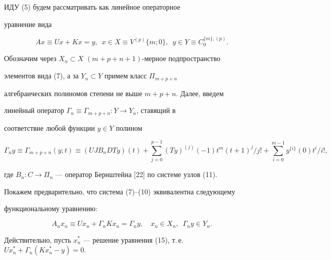 \begin{pf} 


ИДУ (5) будем рассматривать как линейное операторное 


уравнение вида 


\begin{equation} 


Ax\equiv U x+K x=y,\ \; x\in X\equiv V^{(p)}\{m;0\},\ \; 


y\in Y\equiv C^{\{m\},(p)}_0. 


\end{equation} 


 


Обозначим через $X_n\subset X$\; $(m+p+n+1)$-мерное подпространство 


элементов вида (7), а за $Y_n\subset Y$ примем класс $\Pi_{m+p+n}$ 


алгебраических полиномов степени не выше $m+p+n$. Далее, введем 


линейный оператор $\Gamma_n\equiv\Gamma_{m+p+n}:Y\to Y_n$, ставящий в 


соответствие любой функции $y\in Y$ полином 


\begin{equation} 


\Gamma_n y\equiv\Gamma_{m+p+n}(y;t)\equiv(U J B_n D T y)(t)+ 


\sum^{p-1}_{j=0}(T y)^{(j)}(-1)t^m(t+1)^j/j!+ 


\sum^{m-1}_{i=0}y^{\{i\}}(0)t^i/i!, 


\end{equation} 


где $B_n:C\to\Pi_n$ --- оператор Бернштейна [22] по системе узлов (11). 


Покажем предварительно, что система (7)--(10) эквивалентна следующему 


функциональному уравнению: 


\begin{equation} 


A_n x_n\equiv U x_n+\Gamma_n K x_n=\Gamma_n y,\quad 


x_n\in X_n,\ \; \Gamma_n y\in Y_n. 


\end{equation} 


 


Действительно, пусть $x^*_n$ --- решение уравнения (15), т.\,е. $U 


x^*_n+\Gamma_n(K x^*_n-y)=0$. 



\end{pf}
